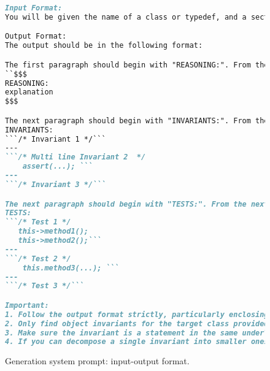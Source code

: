 \begin{figure}
    \centering
    \begin{lstlisting}[language=markdown,firstnumber=15]
Input Format:
You will be given the name of a class or typedef, and a section of code containing the definition of the class. You will also be given the definitions of functions that read and modify the fields of the class. 

Output Format:
The output should be in the following format:

The first paragraph should begin with "REASONING:". From the next line onwards, it should contain the detailed reasoning and analysis used for the inference of the object invariants. The entire text should be enclosed in $$$. For example,
``$$$
REASONING: 
explanation
$$$

The next paragraph should begin with "INVARIANTS:". From the next line onwards, it should contain a list of the various invariants inferred. The invariants should be in the form of code in the same underlying programming language, enclosed by ```. Each invariant should start from a new line, and be separated by "---". Use lambda if necessary. If lambda is recursive, explicitly specify the type of the lambda function and use `std::function` for recursion. Do not use helper functions. For example, 
INVARIANTS: 
```/* Invariant 1 */```
---
```/* Multi line Invariant 2  */
    assert(...); ```
---
```/* Invariant 3 */```

The next paragraph should begin with "TESTS:". From the next line onwards, it should contain a list of a API call sequence in the form of code enclosed by ```. Each test should start from a new line, and be separated by "---". For example, 
TESTS: 
```/* Test 1 */
   this->method1();
   this->method2();```
---
```/* Test 2 */
    this.method3(...); ```
---
```/* Test 3 */```

Important:
1. Follow the output format strictly, particularly enclosing each invariant in triple-ticks (```), and enclosing the reasoning in $$$.
2. Only find object invariants for the target class provided to you, do not infer invariants for any other class. 
3. Make sure the invariant is a statement in the same underlying programming language as the source program.
4. If you can decompose a single invariant into smaller ones, try to output multiple invariants.
\end{lstlisting}
\vspace{-0.1in}
    \caption{\tech Generation system prompt: input-output format.}
    \label{fig:prompt_generation_system_inputoutput}
\end{figure}

